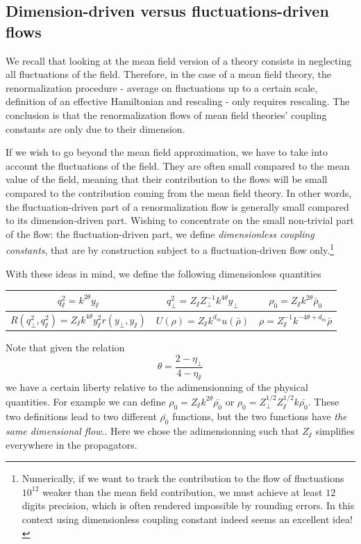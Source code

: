 \subsection{Dimension-driven versus fluctuations-driven flows}
We recall that looking at the mean field version of a theory consists in neglecting all fluctuations of the field. Therefore, in the case of a mean field theory, the renormalization procedure - average on fluctuations up to a certain scale, definition of an effective Hamiltonian and rescaling - only requires rescaling. 
The conclusion is that the renormalization flows of mean field theories' coupling constants are only due to their dimension.

If we wish to go beyond the mean field approximation, we have to take into account the fluctuations of the field.
They are often small compared to the mean value of the field, meaning that their contribution to the flows will be small compared to the contribution coming from the mean field theory. In other words, the fluctuation-driven part of a renormalization flow is generally small compared to its dimension-driven part. 
Wishing to concentrate on the small non-trivial part of the flow: the fluctuation-driven part, we define \textit{dimensionless coupling constants}, that are by construction subject to a fluctuation-driven flow only.\footnote{Numerically, if we want to track the contribution to the flow of fluctuations $10^{12}$ weaker than the mean field contribution, we must achieve at least $12$ digits precision, which is often rendered impossible by rounding errors. In this context using dimensionless coupling constant indeed seems an excellent idea!}

With these ideas in mind, we define the following dimensionless quantities 


\begin{center}
\begin{tabular}{|c|c|c|}
\hline
$q_\sslash^2 = k^{2 \theta} y_\sslash$ & $q_\perp^2 = Z_\sslash Z_\perp^{-1} k^{4\theta} y_\perp$ & $\rho_0 = Z_\sslash k^{2\theta} \bar \rho_0$\\ 
\hline 
$R(q_\perp^2,q_\sslash^2) = Z_\sslash k^{4\theta} y_\sslash^2 r(y_\perp, y_\sslash)$ & $U(\rho) = Z_\sslash k^{d_m} u(\bar{\rho})$ & $\rho = Z_\sslash^{-1} k^{-4\theta + d_m} \bar{\rho}$ \\ 
\hline 
\end{tabular}
\end{center}

Note that given the relation
\begin{equation}
\theta = \frac{2-\eta_\perp}{4-\eta_\sslash}
\end{equation}
we have a certain liberty relative to the adimensionning of the physical quantities. For example we can define $\rho_0 = Z_\sslash k^{2\theta} \bar{\rho_0}$ or $\rho_0 = Z_\perp^{1/2}Z_\sslash^{1/2}k\bar{\rho_0}$. These two definitions lead to two different $\bar{\rho_0}$ functions, but the two functions have \textit{the same dimensional flow}.. Here we chose the adimensionning such that $Z_\sslash$ simplifies everywhere in the propagators. 

